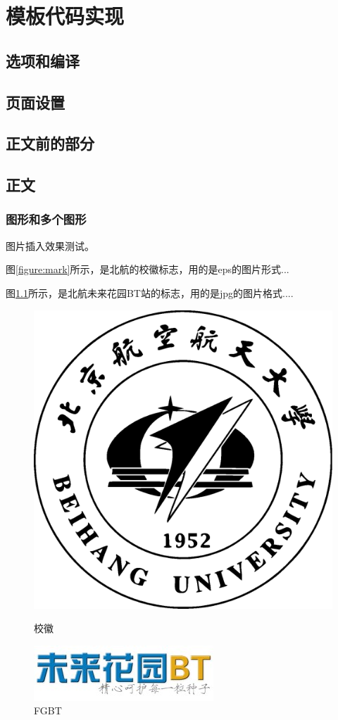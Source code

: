 \chapter{模板代码实现}
	\section{选项和编译}
	\section{页面设置}
	\newpage
	\section{正文前的部分}
	\section{正文}
		\subsection{图形和多个图形}
图片插入效果测试。\par
图\ref{figure:mark}所示，是北航的校徽标志，用的是eps的图片形式...\par
图\ref{figure:fgbt}所示，是北航未来花园BT站的标志，用的是jpg的图片格式....
\begin{figure}[htb!]
\begin{center}
\includegraphics[width=90bp]{figure/buaamark.eps}
\caption{校徽\label{figure:mark}}
\includegraphics[scale=.8]{figure/fgbt.jpg}
\caption{FGBT\label{figure:fgbt}}
\end{center}
\end{figure}
